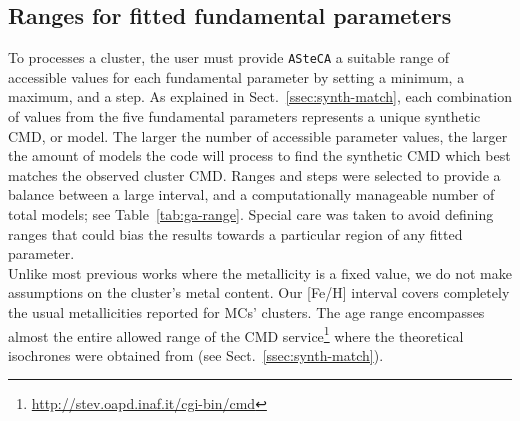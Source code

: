 \documentclass{aa}
\begin{document}

\subsection{Ranges for fitted fundamental parameters}
\label{ssec:param-ranges}

To processes a cluster, the user must provide \texttt{ASteCA} a
suitable range of accessible values for each fundamental parameter by
setting a minimum, a maximum, and a step.
%
As explained in Sect.~\ref{ssec:synth-match}, each combination of values
from the five fundamental parameters represents a unique synthetic CMD, or
model.
%
%
The larger the number of accessible parameter values, the larger the
amount of models the code will process to find the synthetic CMD which best
matches the observed cluster CMD.\@
%
Ranges and steps were selected to provide a balance between a large interval,
and a computationally manageable number of total models;
see Table~\ref{tab:ga-range}. Special care was taken to avoid defining ranges
that could bias the results towards a particular region of any fitted
parameter.\\

Unlike most previous works where the metallicity is a fixed value, we do not
make assumptions on the cluster's metal content. Our [Fe/H] interval covers
completely the usual metallicities reported for MCs' clusters.
The age range encompasses almost the entire allowed range of the CMD
service\footnote{\url{http://stev.oapd.inaf.it/cgi-bin/cmd}}
where the theoretical isochrones were obtained from (see
Sect.~\ref{ssec:synth-match}).
\end{document}
